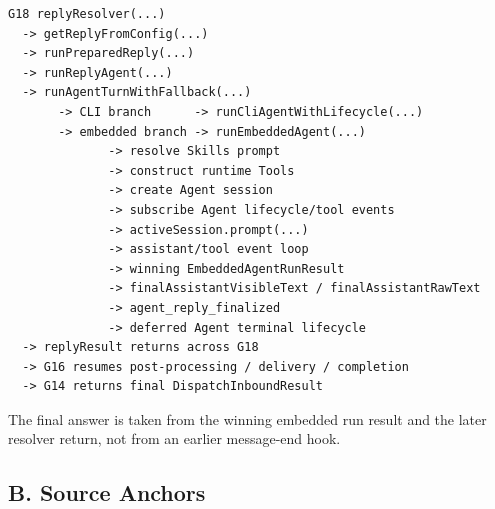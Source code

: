 \begin{verbatim}
G18 replyResolver(...)
  -> getReplyFromConfig(...)
  -> runPreparedReply(...)
  -> runReplyAgent(...)
  -> runAgentTurnWithFallback(...)
       -> CLI branch      -> runCliAgentWithLifecycle(...)
       -> embedded branch -> runEmbeddedAgent(...)
              -> resolve Skills prompt
              -> construct runtime Tools
              -> create Agent session
              -> subscribe Agent lifecycle/tool events
              -> activeSession.prompt(...)
              -> assistant/tool event loop
              -> winning EmbeddedAgentRunResult
              -> finalAssistantVisibleText / finalAssistantRawText
              -> agent_reply_finalized
              -> deferred Agent terminal lifecycle
  -> replyResult returns across G18
  -> G16 resumes post-processing / delivery / completion
  -> G14 returns final DispatchInboundResult
\end{verbatim}

The final answer is taken from the winning embedded run result and the
later resolver return, not from an earlier message-end hook.

\subsection*{B. Source Anchors}

